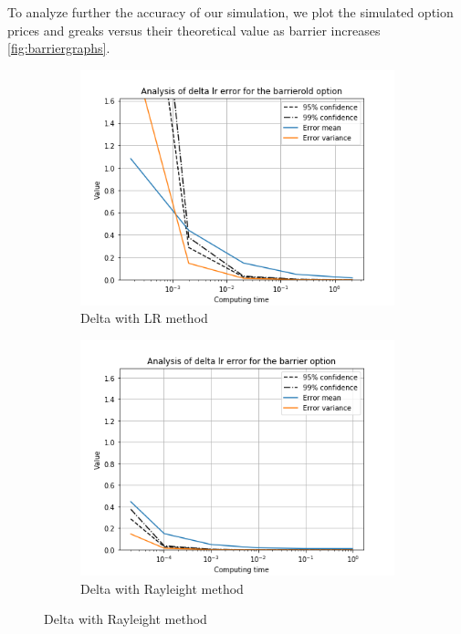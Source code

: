 \documentclass[11pt,a4paper,fleqn,draft]{article}
\begin{document}
To analyze further the accuracy of our simulation, we plot the simulated option prices and greaks versus their theoretical value as barrier increases \ref{fig:barriergraphs}.

\begin{figure}[h!]
  \centering
      \begin{subfigure}[b]{0.45\textwidth}
          \includegraphics[width=\textwidth]{graphs/barrierolddeltalrtime.png}
          \caption{Delta with LR method}
      \end{subfigure}
      \begin{subfigure}[b]{0.45\textwidth}
          \includegraphics[width=\textwidth]{graphs/barrierdeltalrtime.png}
          \caption{Delta with Rayleight method}
      \end{subfigure}


\end{figure}
\end{document}
